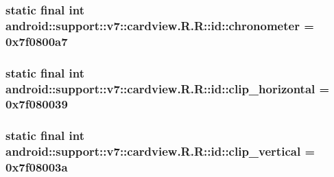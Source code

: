 \hypertarget{classandroid_1_1support_1_1v7_1_1cardview_1_1_r_1_1id_56a226fd50817023184783ce30ef46d6}{
\subsubsection[{chronometer}]{\setlength{\rightskip}{0pt plus 5cm}static final int android::support::v7::cardview.R.R::id::chronometer = 0x7f0800a7}}
\label{classandroid_1_1support_1_1v7_1_1cardview_1_1_r_1_1id_56a226fd50817023184783ce30ef46d6}


\hypertarget{classandroid_1_1support_1_1v7_1_1cardview_1_1_r_1_1id_359687fc1f359f5557fdc439d8b80c5d}{
\subsubsection[{clip\_\-horizontal}]{\setlength{\rightskip}{0pt plus 5cm}static final int android::support::v7::cardview.R.R::id::clip\_\-horizontal = 0x7f080039}}
\label{classandroid_1_1support_1_1v7_1_1cardview_1_1_r_1_1id_359687fc1f359f5557fdc439d8b80c5d}


\hypertarget{classandroid_1_1support_1_1v7_1_1cardview_1_1_r_1_1id_925dc46312587c593f575269045b9dab}{
\subsubsection[{clip\_\-vertical}]{\setlength{\rightskip}{0pt plus 5cm}static final int android::support::v7::cardview.R.R::id::clip\_\-vertical = 0x7f08003a}}
\label{classandroid_1_1support_1_1v7_1_1cardview_1_1_r_1_1id_925dc46312587c593f575269045b9dab}


